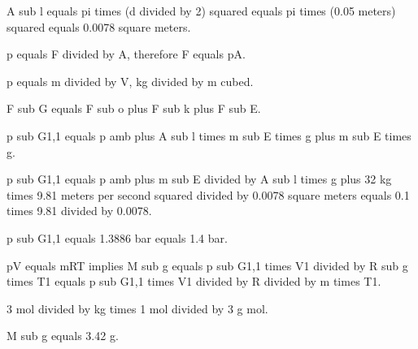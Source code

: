 A sub l equals pi times (d divided by 2) squared equals pi times (0.05 meters) squared equals 0.0078 square meters.

p equals F divided by A, therefore F equals pA.

p equals m divided by V, kg divided by m cubed.

F sub G equals F sub o plus F sub k plus F sub E.

p sub G1,1 equals p amb plus A sub l times m sub E times g plus m sub E times g.

p sub G1,1 equals p amb plus m sub E divided by A sub l times g plus 32 kg times 9.81 meters per second squared divided by 0.0078 square meters equals 0.1 times 9.81 divided by 0.0078.

p sub G1,1 equals 1.3886 bar equals 1.4 bar.

pV equals mRT implies M sub g equals p sub G1,1 times V1 divided by R sub g times T1 equals p sub G1,1 times V1 divided by R divided by m times T1.

3 mol divided by kg times 1 mol divided by 3 g mol.

M sub g equals 3.42 g.